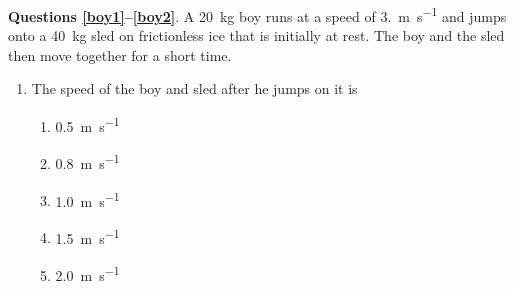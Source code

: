 \documentclass{../../../oss-apphys}
\begin{document}
\begin{multicols}{2}

    
  \textbf{Questions \ref{boy1}--\ref{boy2}}. A \SI{20}{\kilo\gram} boy runs at
  a speed of \SI{3.}{\metre\per\second} and jumps onto a \SI{40}{\kilo\gram}
  sled on frictionless ice that is initially at rest. The boy and the sled then
  move together for a short time.
  \begin{enumerate}[resume,leftmargin=18pt]
  \item The speed of the boy and sled after he jumps on it is
    \label{boy1}
    \begin{enumerate}[noitemsep,topsep=0pt,leftmargin=18pt,label=(\Alph*)]
    \item\SI{0.5}{\metre\per\second}
    \item\SI{0.8}{\metre\per\second}
    \item\SI{1.0}{\metre\per\second}
    \item\SI{1.5}{\metre\per\second}
    \item\SI{2.0}{\metre\per\second}
    \end{enumerate}
    

\end{enumerate}
\end{multicols}
\end{document}
